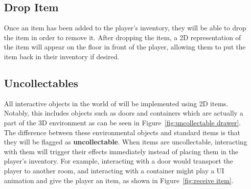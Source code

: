 \subsection{Drop Item}
Once an item has been added to the player's inventory, they will be able to drop the item in order to remove it. After dropping the item, a 2D representation of the item will appear on the floor in front of the player, allowing them to put the item back in their inventory if desired.

\subsection{Uncollectables}
All interactive objects in the world of \ourgame{} will be implemented using 2D items. Notably, this includes objects such as doors and containers which are actually a part of the 3D environment as can be seen in Figure~\ref{fig:uncollectable drawer}. The difference between these environmental objects and standard items is that they will be flagged as \textbf{uncollectable}. When items are uncollectable, interacting with them will trigger their effects immediately instead of placing them in the player's inventory. For example, interacting with a door would transport the player to another room, and interacting with a container might play a UI animation and give the player an item, as shown in Figure~\ref{fig:receive item}.

